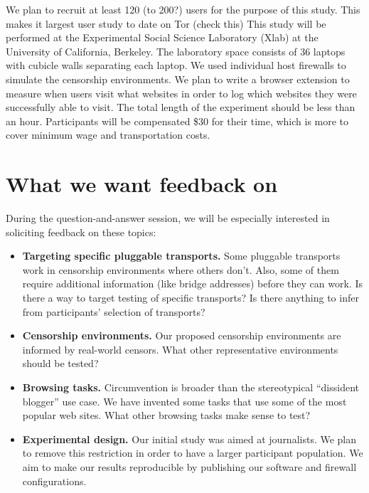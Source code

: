 \documentclass{sig-alternate-hotpets15}
\begin{document}

We plan to recruit at least 120 (to 200?) users for the purpose of this study. This makes it largest user study to date on Tor (check this) This study will be performed at the Experimental Social Science Laboratory (Xlab) at the University of California, Berkeley. The laboratory space consists of 36 laptops with cubicle walls separating each laptop. We used individual host firewalls to simulate the censorship environments. We plan to write a browser extension to measure when users visit what websites in order to log which websites they were successfully able to visit. The total length of the experiment should be less than an hour. Participants will be compensated \$30 for their time, which is more to cover minimum wage and transportation costs.  \\

\section{What we want feedback on}

During the question-and-answer session,
we will be especially interested in soliciting feedback
on these topics:

\begin{itemize} \itemsep1pt \parskip0pt 
\item {\bfseries Targeting specific pluggable transports.}
Some pluggable transports work in censorship environments
where others don't.
Also, some of them require additional information
(like bridge addresses) before they can work.
Is there a way to target testing of specific transports?
Is there anything to infer from participants' selection of transports?

\item {\bfseries Censorship environments.}
Our proposed censorship environments are informed
by real-world censors.
What other representative environments
should be tested?

\item {\bfseries Browsing tasks.}
Circumvention is broader than the stereotypical
``dissident blogger'' use case.
We have invented some tasks that use some of the
most popular web sites.
What other browsing tasks make sense to test?

\item {\bfseries Experimental design.}
Our initial study was aimed at journalists.
We plan to remove this restriction in order
to have a larger participant population.
We aim to make our results reproducible by publishing
our software and firewall configurations.
\end{itemize}
\end{document}
